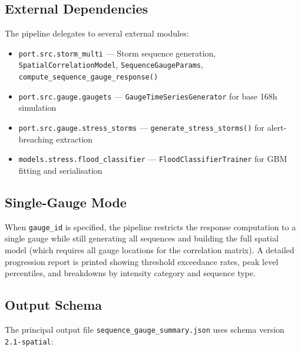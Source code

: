 \documentclass[11pt,a4paper]{article}
\begin{document}
\subsection{External Dependencies}

The pipeline delegates to several external modules:

\begin{itemize}[nosep]
    \item \texttt{port.src.storm\_multi} --- Storm sequence generation,
          \texttt{SpatialCorrelationModel}, \texttt{SequenceGaugeParams},
          \texttt{compute\_sequence\_gauge\_response()}
    \item \texttt{port.src.gauge.gaugets} --- \texttt{GaugeTimeSeriesGenerator}
          for base 168h simulation
    \item \texttt{port.src.gauge.stress\_storms} ---
          \texttt{generate\_stress\_storms()} for alert-breaching extraction
    \item \texttt{models.stress.flood\_classifier} ---
          \texttt{FloodClassifierTrainer} for GBM fitting and serialisation
\end{itemize}

\subsection{Single-Gauge Mode}

When \texttt{gauge\_id} is specified, the pipeline restricts the response
computation to a single gauge while still generating all sequences and
building the full spatial model (which requires all gauge locations for
the correlation matrix). A detailed progression report is printed showing
threshold exceedance rates, peak level percentiles, and breakdowns by
intensity category and sequence type.

\subsection{Output Schema}

The principal output file \texttt{sequence\_gauge\_summary.json} uses
schema version \texttt{2.1-spatial}:
\end{document}
